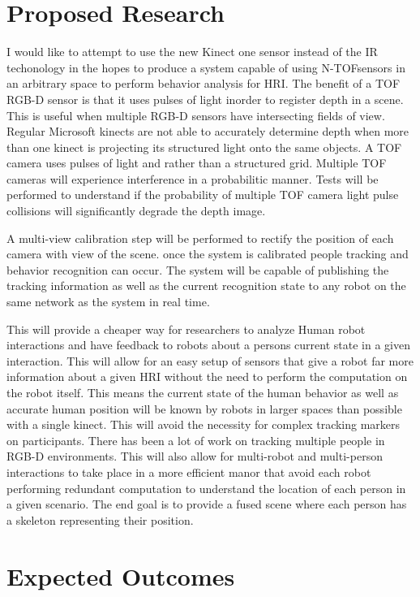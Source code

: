 \documentclass[12pt,a4paper]{article}
\begin{document}
\section{Proposed Research}
I would like to attempt to use the new Kinect one sensor instead of the IR techonology in the hopes to produce a system capable of using N-TOFsensors in an arbitrary space to perform behavior analysis for HRI. The benefit of a TOF RGB-D sensor is that it uses pulses of light inorder to register depth in a scene. This is useful when multiple RGB-D sensors have intersecting fields of view. Regular Microsoft kinects are not able to accurately determine depth when more than one kinect is projecting its structured light onto the same objects. A TOF camera uses pulses of light and rather than a structured grid. Multiple TOF cameras will experience interference in a probabilitic manner. Tests will be performed to understand if the probability of multiple TOF camera light pulse collisions will significantly degrade the depth image.

A multi-view calibration step will be performed to rectify the position of each camera with view of the scene. once the system is calibrated people tracking and behavior recognition can occur. The system will be capable of publishing the tracking information as well as the current recognition state to any robot on the same network as the system in real time.

This will provide a cheaper way for researchers to analyze Human robot interactions and have feedback to robots about a persons current state in a given interaction. This will allow for an easy setup of sensors that give a robot far more information about a given HRI without the need to perform the computation on the robot itself. This means the current state of the human behavior as well as accurate human position will be known by robots in larger spaces than possible with a single kinect. This will avoid the necessity for complex tracking markers on participants. There has been a lot of work on tracking multiple people in RGB-D environments. This will also allow for multi-robot and multi-person interactions to take place in a more efficient manor that avoid each robot performing redundant computation to understand the location of each person in a given scenario. The end goal is to provide a fused scene where each person has a skeleton representing their position.
\section{Expected Outcomes}
\end{document}
